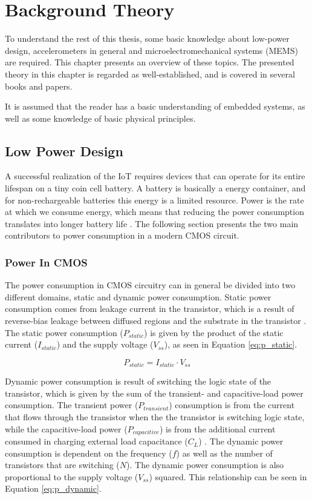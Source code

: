\chapter{Background Theory}
\label{chap:overview}

To understand the rest of this thesis, some basic knowledge about low-power design, accelerometers in general and microelectromechanical systems (MEMS) are required. This chapter presents an overview of these topics. The presented theory in this chapter is regarded as well-established, and is covered in several books and papers.

It is assumed that the reader has a basic understanding of embedded systems, as well as some knowledge of basic physical principles. 

\section{Low Power Design}

A successful realization of the IoT requires devices that can operate for its entire lifespan on a tiny coin cell battery. A battery is basically a energy container, and for non-rechargeable batteries this energy is a limited resource. Power is the rate at which we consume energy, which means that reducing the power consumption translates into longer battery life \cite[~p.3]{holberg06}. The following section presents the two main contributors to power consumption in a modern CMOS circuit. 

\subsection{Power In CMOS}
\label{sec:cmos_power}

The power consumption in CMOS circuitry can in general be divided into two different domains, static and dynamic power consumption. Static power consumption comes from leakage current in the transistor, which is a result of reverse-bias leakage between diffused regions and the
substrate in the transistor \cite{static_dynamic_power}. The static power consumption ($P_{static}$) is given by the product of the static current ($I_{static}$) and the supply voltage ($V_{ss}$), as seen in Equation \ref{eq:p_static}. 

\begin{equation}
P_{static} = I_{static} \cdot V_{ss}
\label{eq:p_static}
\end{equation}

Dynamic power consumption is result of switching the logic state of the transistor, which is given by the sum of the transient- and capacitive-load power consumption. The transient power ($P_{transient}$) consumption is from the current that flows through the transistor when the the transistor is switching logic state, while the capacitive-load power ($P_{capacitive}$) is from the additional current consumed in charging external load capacitance ($C_{L}$) \cite{cmos_power_consumption}. The dynamic power consumption is dependent on the frequency ($f$) as well as the number of transistors that are switching ($N$). The dynamic power consumption is also proportional to the supply voltage ($V_{ss}$) squared. This relationship can be seen in Equation \ref{eq:p_dynamic}.

